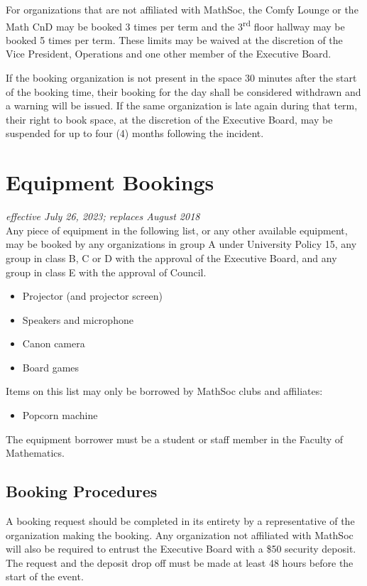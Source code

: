 For organizations that are not affiliated with MathSoc, the Comfy Lounge or the
Math CnD may be booked 3 times per term and the 3\textsuperscript{rd} floor
hallway may be booked 5 times per term. These limits may be waived at the
discretion of the Vice President, Operations and one other member of the
Executive Board.

If the booking organization is not present in the space 30 minutes after the
start of the booking time, their booking for the day shall be considered
withdrawn and a warning will be issued. If the same organization is late again
during that term, their right to book space, at the discretion of the Executive
Board, may be suspended for up to four (4) months following the incident.

\section{Equipment Bookings}
\emph{effective July 26, 2023; replaces August 2018}\\

Any piece of equipment in the following list, or any other available equipment,
may be booked by any organizations in group A under University Policy 15, any
group in class B, C or D with the approval of the Executive Board, and any
group in class E with the approval of Council.

\begin{itemize}
  \item Projector (and projector screen)
  \item Speakers and microphone
  \item Canon camera
  \item Board games
\end{itemize}

Items on this list may only be borrowed by MathSoc clubs and affiliates:

\begin{itemize}
  \item Popcorn machine
\end{itemize}

The equipment borrower must be a student or staff member in the Faculty of Mathematics.

\subsection{Booking Procedures}

A booking request should be completed in its entirety by a
representative of the organization making the booking. Any organization not
affiliated with MathSoc will also be required to entrust the Executive Board
with a \$50 security deposit. The request and the deposit drop off must be made
at least 48 hours before the start of the event.

